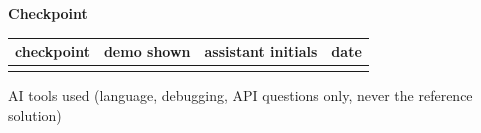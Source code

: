 \documentclass[a4paper,10pt]{article}
\begin{document}
\vspace{4pt}\noindent\textbf{Checkpoint}

\begin{tabular}{|>{\raggedright\hyphenpenalty 500\arraybackslash}p{4.87cm}|>{\raggedright\hyphenpenalty 500\arraybackslash}p{2.80cm}|>{\raggedright\hyphenpenalty 500\arraybackslash}p{4.48cm}|>{\raggedright\hyphenpenalty 500\arraybackslash}p{2.34cm}|}
\hline
\textbf{checkpoint} & \textbf{demo shown} & \textbf{assistant initials} & \textbf{date} \\
\hline
\rule{0pt}{2.4em} & \rule{0pt}{2.4em} & \rule{0pt}{2.4em} & \rule{0pt}{2.4em} \\
\hline
\end{tabular}

\vspace{2pt}\noindent AI tools used (language, debugging, API questions only, never the reference solution)\hrulefill

\newpage
\end{document}
